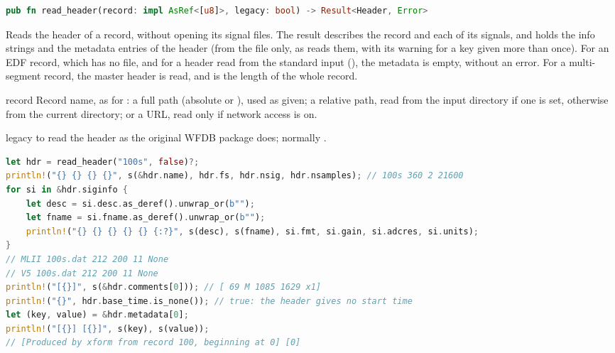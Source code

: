 \begin{lstlisting}[language=Rust,style=signature]
pub fn read_header(record: impl AsRef<[u8]>, legacy: bool) -> Result<Header, Error>
\end{lstlisting}
Reads the header of a record, without opening its signal files. The result describes the
record and each of its signals, and holds the info strings and the metadata entries of the
header (from the  file only, as  reads them, with its
warning for a key given more than once). For an EDF record, which has no 
file, and for a header read from the standard input (), the metadata is empty,
without an error. For a multi-segment record, the master header is read, and
 is the length of the whole record.
\begin{params}
\item[record] Record name, as for : a full path (absolute or
  \code{\textasciitilde}), used as given; a relative path, read from the input directory
  if one is set, otherwise from the current directory; or a URL, read only if network
  access is on.
\item[legacy]  to read the header as the original WFDB package does; normally
  .
\end{params}
\begin{lstlisting}[language=Rust,style=example]
let hdr = read_header("100s", false)?;
println!("{} {} {} {}", s(&hdr.name), hdr.fs, hdr.nsig, hdr.nsamples); // 100s 360 2 21600
for si in &hdr.siginfo {
    let desc = si.desc.as_deref().unwrap_or(b"");
    let fname = si.fname.as_deref().unwrap_or(b"");
    println!("{} {} {} {} {} {:?}", s(desc), s(fname), si.fmt, si.gain, si.adcres, si.units);
}
// MLII 100s.dat 212 200 11 None
// V5 100s.dat 212 200 11 None
println!("[{}]", s(&hdr.comments[0])); // [ 69 M 1085 1629 x1]
println!("{}", hdr.base_time.is_none()); // true: the header gives no start time
let (key, value) = &hdr.metadata[0];
println!("[{}] [{}]", s(key), s(value));
// [Produced by xform from record 100, beginning at 0] [0]
\end{lstlisting}

